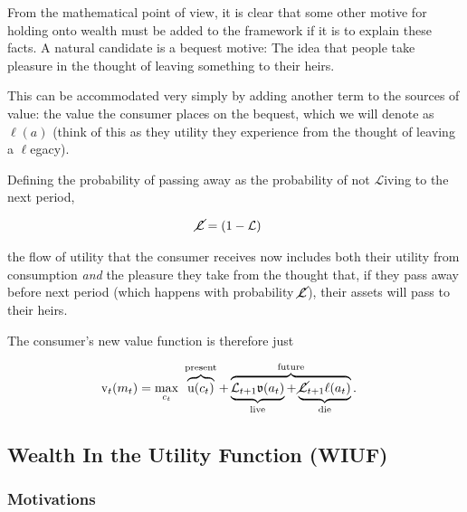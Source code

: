 \documentclass{article}
\newcommand{\uFunc}{\mathrm{u}}
\newcommand{\vFunc}{\mathrm{v}}
\newcommand{\Alive}{\mathcal{L}}
\newcommand{\cNrm}{c}
\newcommand{\aNrm}{a}
\newcommand{\mNrm}{m}
\begin{document}
From the mathematical point of view, it is clear that some other motive for holding onto wealth must be added to the framework if it is to explain these facts. A natural candidate is a bequest motive: The idea that people take pleasure in the thought of leaving something to their heirs.

This can be accommodated very simply by adding another term to the sources of value: the value the consumer places on the bequest, which we will denote as $\ell(\aNrm)$ (think of this as they utility they experience from the thought of leaving a $\ell$egacy).

Defining the probability of passing away as the probability of not $\Alive$iving to the next period,

\begin{align}
    \cancel{\Alive} & =(1-\Alive)
\end{align}

the flow of utility that the consumer receives now includes both their utility from consumption \textit{and} the pleasure they take from the thought that, if they pass away before next period (which happens with probability $\cancel{\Alive}$), their assets will pass to their heirs.

The consumer's new value function is therefore just

\begin{align}
    {\vFunc}_{t}({\mNrm}_{t}) & = \max_{\cNrm_{t}} ~ \overbrace{\uFunc(\cNrm_{t})}^{\text{present}}+\overbrace{\underbrace{\Alive_{t+1}\mathfrak{v}(\aNrm_{t})}_{\text{live}} + \underbrace{\cancel{\Alive}_{t+1}\ell({\aNrm}_{t})}_{\text{die}}
    }^{\text{future}}.
\end{align}


\subsection{Wealth In the Utility Function (WIUF)}

\subsubsection{Motivations}
\end{document}
